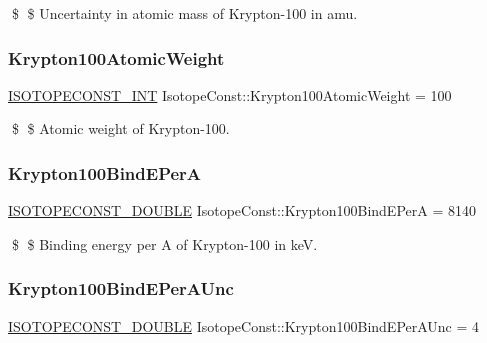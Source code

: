 \$ \$ Uncertainty in atomic mass of Krypton-\/100 in amu. \mbox{\label{group___isotope_const-_krypton-_kr100_gaed97f1d57ce2f0c62b97997c43e58ad3}} 
\subsubsection{\texorpdfstring{Krypton100\+Atomic\+Weight}{Krypton100AtomicWeight}}
{\footnotesize\ttfamily \mbox{\hyperlink{group___isotope_const-_macros_ga5f18360b3e99483a35c32d789e62621c}{I\+S\+O\+T\+O\+P\+E\+C\+O\+N\+S\+T\+\_\+\+I\+NT}} Isotope\+Const\+::\+Krypton100\+Atomic\+Weight = 100}

\$ \$ Atomic weight of Krypton-\/100. \mbox{\label{group___isotope_const-_krypton-_kr100_gaa2b791fed68a0aa3f56bf38fd8579814}} 
\subsubsection{\texorpdfstring{Krypton100\+Bind\+E\+PerA}{Krypton100BindEPerA}}
{\footnotesize\ttfamily \mbox{\hyperlink{group___isotope_const-_macros_ga8f45a7272ce02c0b4c65c44636ed719a}{I\+S\+O\+T\+O\+P\+E\+C\+O\+N\+S\+T\+\_\+\+D\+O\+U\+B\+LE}} Isotope\+Const\+::\+Krypton100\+Bind\+E\+PerA = 8140}

\$ \$ Binding energy per A of Krypton-\/100 in keV. \mbox{\label{group___isotope_const-_krypton-_kr100_ga9170cdb5d73201e496a96a6349735a72}} 
\subsubsection{\texorpdfstring{Krypton100\+Bind\+E\+Per\+A\+Unc}{Krypton100BindEPerAUnc}}
{\footnotesize\ttfamily \mbox{\hyperlink{group___isotope_const-_macros_ga8f45a7272ce02c0b4c65c44636ed719a}{I\+S\+O\+T\+O\+P\+E\+C\+O\+N\+S\+T\+\_\+\+D\+O\+U\+B\+LE}} Isotope\+Const\+::\+Krypton100\+Bind\+E\+Per\+A\+Unc = 4}

